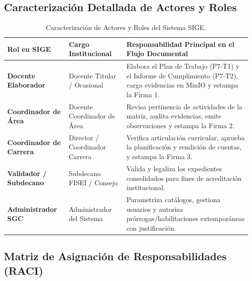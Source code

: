 \documentclass[12pt,a4paper]{article}
\begin{document}
\subsection{Caracterización Detallada de Actores y Roles}

\begin{table}[htbp]
\centering
\small
\renewcommand{\arraystretch}{1.2}
\begin{tabularx}{\textwidth}{|>{\bfseries}m{3.2cm}|m{3.2cm}|X|}
\hline
\rowcolor{tableheader}
Rol en SIGE & Cargo Institucional & Responsabilidad Principal en el Flujo Documental \\
\hline
\textbf{Docente Elaborador} & Docente Titular / Ocasional & Elabora el Plan de Trabajo (P7-T1) y el Informe de Cumplimiento (P7-T2), carga evidencias en MinIO y estampa la Firma 1. \\
\hline
\textbf{Coordinador de Área} & Docente Coordinador de Área & Revisa pertinencia de actividades de la matriz, audita evidencias, emite observaciones y estampa la Firma 2. \\
\hline
\textbf{Coordinador de Carrera} & Director / Coordinador Carrera & Verifica articulación curricular, aprueba la planificación y rendición de cuentas, y estampa la Firma 3. \\
\hline
\textbf{Validador / Subdecano} & Subdecano FISEI / Consejo & Valida y legaliza los expedientes consolidados para fines de acreditación institucional. \\
\hline
\textbf{Administrador SGC} & Administrador del Sistema & Parametriza catálogos, gestiona usuarios y autoriza prórrogas/habilitaciones extemporáneas con justificación. \\
\hline
\end{tabularx}
\caption{Caracterización de Actores y Roles del Sistema SIGE.}
\label{tab:actores_roles}
\end{table}

\subsection{Matriz de Asignación de Responsabilidades (RACI)}
\end{document}
